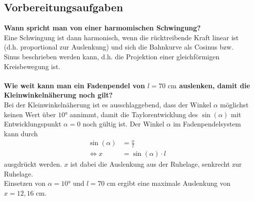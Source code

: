 \subsection{Vorbereitungsaufgaben}
\label{sec:Vorbereitungsaufgaben}
\textbf{Wann spricht man von einer harmomischen Schwingung?}\\
Eine Schwingung ist dann harmonisch, wenn die rücktreibende Kraft linear ist (d.h. proportional zur Auslenkung) und sich die Bahnkurve als 
Cosinus bzw. Sinus beschrieben werden kann, d.h. die Projektion einer gleichförmigen Kreisbewegung ist. 
\\
\\
\textbf{Wie weit kann man ein Fadenpendel von $l = 70 \,\,\unit{\centi\meter}$ auslenken, damit die Kleinwinkelnäherung noch gilt?}\\
Bei der Kleinwinkelnäherung ist es ausschlaggebend, dass der Winkel $\alpha$ möglichst keinen Wert über $10°$ annimmt, 
damit die Taylorentwicklung des $\sin(\alpha)$ mit Entwicklungspunkt $\alpha = 0$ noch gültig ist. 
Der Winkel $\alpha$ im Fadenpendelsystem kann durch
\begin{align*}
    \sin(\alpha) &= \frac{x}{l} \\
    \Leftrightarrow x &= \sin(\alpha) \cdot l
\end{align*}
ausgdrückt werden. $x$ ist dabei die Auslenkung aus der Ruhelage, senkrecht zur Ruhelage. \\
Einsetzen von $\alpha = 10°$ und $l = 70 \,\, \unit{\centi\meter}$ ergibt eine maximale Auslenkung von $x = 12,16 \,\, \unit{\centi\meter}$. 